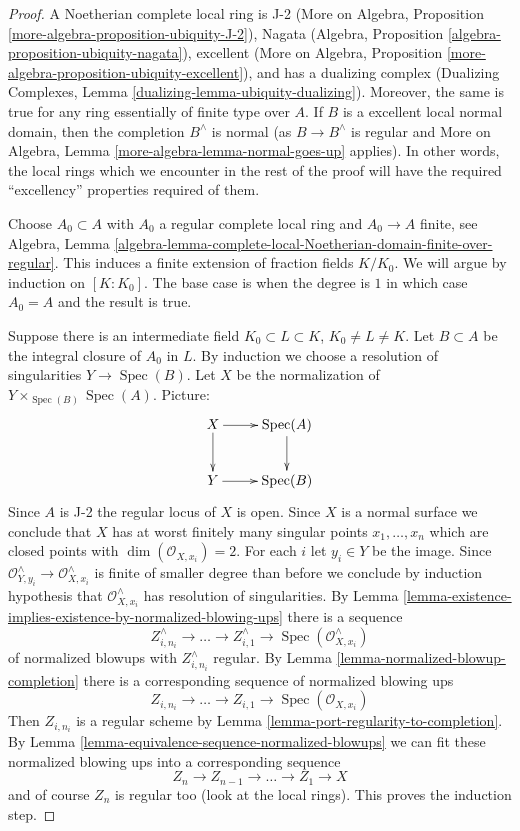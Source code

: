 \documentclass{stacks-project}
\theoremstyle{plain}
\theoremstyle{definition}
\theoremstyle{remark}
\numberwithin{equation}{subsection}
\def\Spec{\mathop{\mathrm{Spec}}}
\begin{document}
\begin{proof}
A Noetherian complete local ring is J-2
(More on Algebra, Proposition \ref{more-algebra-proposition-ubiquity-J-2}),
Nagata (Algebra, Proposition \ref{algebra-proposition-ubiquity-nagata}),
excellent (More on Algebra, Proposition
\ref{more-algebra-proposition-ubiquity-excellent}),
and has a dualizing complex
(Dualizing Complexes, Lemma \ref{dualizing-lemma-ubiquity-dualizing}).
Moreover, the same is true for any ring essentially of finite type over $A$.
If $B$ is a excellent local normal domain, then the completion
$B^\wedge$ is normal (as $B \to B^\wedge$ is regular and
More on Algebra, Lemma \ref{more-algebra-lemma-normal-goes-up} applies).
In other words, the local rings which we encounter in the rest of the proof
will have the required ``excellency'' properties required of them.

\medskip\noindent
Choose $A_0 \subset A$ with $A_0$ a regular complete local ring
and $A_0 \to A$ finite, see Algebra, Lemma
\ref{algebra-lemma-complete-local-Noetherian-domain-finite-over-regular}.
This induces a finite extension of fraction fields $K/K_0$.
We will argue by induction on $[K : K_0]$. The base case is
when the degree is $1$ in which case $A_0 = A$ and the result is true.

\medskip\noindent
Suppose there is an intermediate field $K_0 \subset L \subset K$,
$K_0 \not = L \not = K$. Let $B \subset A$ be the integral closure
of $A_0$ in $L$. By induction we choose a resolution of singularities
$Y \to \Spec(B)$. Let $X$ be the normalization
of $Y \times_{\Spec(B)} \Spec(A)$. Picture:
$$
\xymatrix{
X \ar[r] \ar[d] & \Spec(A) \ar[d] \\
Y \ar[r] & \Spec(B)
}
$$
Since $A$ is J-2 the regular locus of $X$ is open. Since $X$
is a normal surface we conclude that $X$ has at worst finitely
many singular points $x_1, \ldots, x_n$ which are closed points with
$\dim(\mathcal{O}_{X, x_i}) = 2$.
For each $i$ let $y_i \in Y$ be the image.
Since
$\mathcal{O}_{Y, y_i}^\wedge \to \mathcal{O}_{X, x_i}^\wedge$
is finite of smaller degree than before we conclude by
induction hypothesis that $\mathcal{O}_{X, x_i}^\wedge$
has resolution of singularities. By
Lemma \ref{lemma-existence-implies-existence-by-normalized-blowing-ups}
there is a sequence
$$
Z^\wedge_{i, n_i} \to \ldots \to Z^\wedge_{i, 1} \to
\Spec(\mathcal{O}_{X, x_i}^\wedge)
$$
of normalized blowups with $Z^\wedge_{i, n_i}$ regular.
By Lemma \ref{lemma-normalized-blowup-completion}
there is a corresponding sequence of normalized blowing ups
$$
Z_{i, n_i} \to \ldots \to Z_{i, 1} \to \Spec(\mathcal{O}_{X, x_i})
$$
Then $Z_{i, n_i}$ is a regular scheme by
Lemma \ref{lemma-port-regularity-to-completion}.
By Lemma \ref{lemma-equivalence-sequence-normalized-blowups}
we can fit these normalized blowing ups
into a corresponding sequence
$$
Z_n \to Z_{n - 1} \to \ldots \to Z_1 \to X
$$
and of course $Z_n$ is regular too (look at the local rings).
This proves the induction step.


\end{proof}
\end{document}
